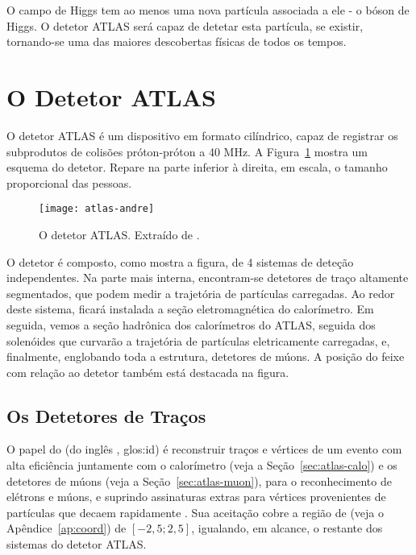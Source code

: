 O campo de Higgs tem ao menos uma nova partícula associada a ele - o bóson de
Higgs. O detetor ATLAS será capaz de detetar esta partícula, se existir,
tornando-se uma das maiores descobertas físicas de todos os tempos.

\section{O Detetor ATLAS}

O detetor ATLAS é um dispositivo em formato cilíndrico, capaz de registrar os
subprodutos de colisões próton-próton a 40 MHz. A
Figura~\ref{fig:atlas-scheme} mostra um esquema do detetor. Repare na parte
inferior à direita, em escala, o tamanho proporcional das pessoas.

\begin{figure}
\begin{center}
\texttt{[image: atlas-andre]}
\end{center}
\caption{O detetor ATLAS. Extraído de \cite{cern}.}
\label{fig:atlas-scheme}
\end{figure}

O detetor  é composto, como mostra a figura, de 4 sistemas de
deteção independentes. Na parte mais interna, encontram-se detetores de traço
altamente segmentados, que podem medir a trajetória de partículas
carregadas. Ao redor deste sistema, ficará instalada a seção eletromagnética
do calorímetro. Em seguida, vemos a seção hadrônica dos calorímetros do ATLAS,
seguida dos solenóides que curvarão a trajetória de partículas eletricamente
carregadas, e, finalmente, englobando toda a estrutura, detetores de múons. A
posição do feixe com relação ao detetor também está destacada na figura.

\subsection{Os Detetores de Traços}
\label{sec:atlas-id}

O papel do  (do inglês ,
\gls{glos:id}) é reconstruir traços e vértices de um evento com alta
eficiência juntamente com o calorímetro (veja a Seção~\ref{sec:atlas-calo}) e
os detetores de múons (veja a Seção~\ref{sec:atlas-muon}), para o
reconhecimento de elétrons e múons, e suprindo assinaturas extras para
vértices provenientes de partículas que decaem rapidamente
\cite{atlas-id-tdr}. Sua aceitação cobre a região de
 (veja o Apêndice~\ref{ap:coord}) de $[-2,5; 2,5]$,
igualando, em alcance, o restante dos sistemas do detetor ATLAS.

